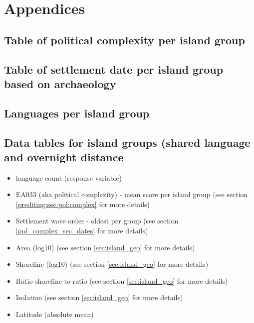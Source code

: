 \documentclass[a4paper,10pt]{article} %
\begin{document}
\newpage
\singlespacing
\appendix
\section*{Appendices}
\renewcommand{\thesubsection}{\Alph{subsection}}



\newpage
\subsection{Table of political complexity per island group }
\singlespacing
\label{appendix_pol_complex}

\newpage
\subsection{Table of settlement date per island group based on archaeology}
\singlespacing
\label{dates_table_appendic}





\subsection{Languages per island group}
\label{Subregions}
\singlespacing

\subsection{Data tables for island groups (shared language and overnight distance}
\singlespacing


\begin{itemize}
\item language count (response variable)
\item EA033 (aka political complexity) - mean score per island group (see section \ref{prediting:sec:pol:complex} for more details)
\item Settlement wave order - oldest per group (see section \ref{pol_complex_sec_dates} for more details)
\item Area (log10) (see section \ref{sec:island_geo} for more details)
\item Shoreline (log10) (see section \ref{sec:island_geo} for more details)
\item Ratio shoreline to ratio (see section \ref{sec:island_geo} for more details)
\item Isolation (see section \ref{sec:island_geo} for more details)
\item Latitude (absolute mean)
\end{itemize}
\end{document}
